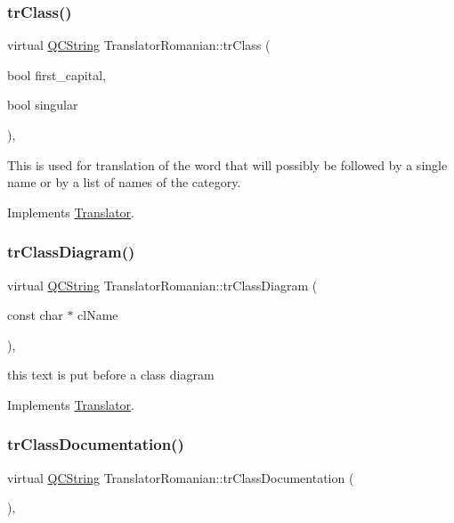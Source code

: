 \subsubsection{\texorpdfstring{trClass()}{trClass()}}
{\footnotesize\ttfamily virtual \mbox{\hyperlink{class_q_c_string}{Q\+C\+String}} Translator\+Romanian\+::tr\+Class (\begin{DoxyParamCaption}\item[{bool}]{first\+\_\+capital,  }\item[{bool}]{singular }\end{DoxyParamCaption})\hspace{0.3cm}{\ttfamily [inline]}, {\ttfamily [virtual]}}

This is used for translation of the word that will possibly be followed by a single name or by a list of names of the category. 

Implements \mbox{\hyperlink{class_translator}{Translator}}.

\mbox{\label{class_translator_romanian_aad428d522945a9db9d881f6d129d957f}} 
\subsubsection{\texorpdfstring{trClassDiagram()}{trClassDiagram()}}
{\footnotesize\ttfamily virtual \mbox{\hyperlink{class_q_c_string}{Q\+C\+String}} Translator\+Romanian\+::tr\+Class\+Diagram (\begin{DoxyParamCaption}\item[{const char $\ast$}]{cl\+Name }\end{DoxyParamCaption})\hspace{0.3cm}{\ttfamily [inline]}, {\ttfamily [virtual]}}

this text is put before a class diagram 

Implements \mbox{\hyperlink{class_translator}{Translator}}.

\mbox{\label{class_translator_romanian_a1caa6f99f1b63130a0210f369bbe6b9f}} 
\subsubsection{\texorpdfstring{trClassDocumentation()}{trClassDocumentation()}}
{\footnotesize\ttfamily virtual \mbox{\hyperlink{class_q_c_string}{Q\+C\+String}} Translator\+Romanian\+::tr\+Class\+Documentation (\begin{DoxyParamCaption}{ }\end{DoxyParamCaption})\hspace{0.3cm}{\ttfamily [inline]}, {\ttfamily [virtual]}}

